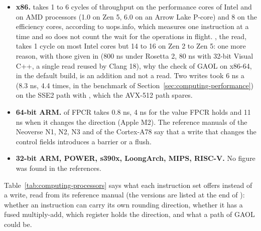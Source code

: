 \begin{itemize}
\item[$\bullet$] \textbf{x86.}  takes 1 to 6 cycles of
throughput on the performance cores of Intel and on AMD processors (1.0 on
Zen 5, 6.0 on an Arrow Lake P-core) and 8 on the efficiency cores, according
to uops.info, which measures one instruction at a time and so does not count
the wait for the operations in flight. , the read, takes 1
cycle on most Intel cores but 14 to 16 on Zen 2 to Zen 5: one more reason,
with those given in  (800 ns under Rosetta 2, 80 ns
with 32-bit Visual C++, a single read reused by Clang 18), why the check of
GAOL on x86-64, in the default build, is an addition and not a read. Two writes took 6 ns a
 (8.3 ns, 4.4 times, in the benchmark of
Section~\ref{sec:computing-performance}) on the SSE2 path with , which the AVX-512 path spares.
\item[$\bullet$] \textbf{64-bit ARM.}  of FPCR takes 0.8 ns,
 4 ns for the value FPCR holds and 11 ns when it changes the
direction (Apple M2). The reference manuals of the Neoverse N1, N2, N3 and
of the Cortex-A78 say that a write that changes the control fields
introduces a barrier or a flush.
\item[$\bullet$] \textbf{32-bit ARM, POWER, s390x, LoongArch, MIPS, RISC-V.}
No figure was found in the references.
\end{itemize}

\medskip
\noindent Table~\ref{tab:computing-processors} says what each instruction
set offers instead of a write, read from its reference manual (the versions
are listed at the end of ): whether an instruction can
carry its own rounding direction, whether it has a fused multiply-add, which
register holds the direction, and what a path of GAOL could be.

